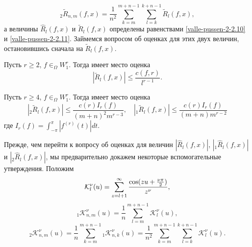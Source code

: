 \begin{equation}\label{valle-pussen-2-2.18}
_2\tilde R_{n,m}(f,x)=\frac1{n^2}\sum_{k=m}^{m+n-1}
\sum_{l=k}^{k+n-1}\tilde R_l(f,x),
\end{equation}
 а величины $\hat R_l(f,x)$  и $\tilde R_l(f,x)$ определены равенствами \eqref{valle-pussen-2-2.10} и \eqref{valle-pussen-2-2.11}. Займемся  вопросом об оценках для этих двух величин, остановившись сначала на  $\tilde R_l(f,x)$.
\begin{lemma}\label{valle-pussen-l2.2}
Пусть $r\ge2$, $f\in _\Omega W^r_1$. Тогда имеет место оценка
\begin{equation}\label{valle-pussen-2-2.19}
|\tilde R_l(f,x)|\le \frac{c(f,r)}{l^{r-1}}.
\end{equation}
\end{lemma}

\begin{lemma}\label{valle-pussen-l2.3}
Пусть $r\ge4$, $f\in _\Omega W^r_1$. Тогда имеет место оценка
\begin{equation*}
|_2\tilde R_l(f,x)|\le \frac{c(r)I_r(f)}{(m+n)^2m^{r-3}}, \quad |_1\tilde R_l(f,x)|\le \frac{c(r)I_r(f)}{(m+n)m^{r-2}}
\end{equation*}
где $I_r(f)=\int_{-\pi}^\pi|f^{(r)}(t)|dt$.
\end{lemma}

Прежде, чем перейти к вопросу об оценках для величин $|\hat R_l(f,x)|$, $|_1\hat R_l(f,x)|$ и $|_2\hat R_l(f,x)|$, мы предварительно докажем некоторые вспомогательные утверждения. Положим
\begin{equation}\label{valle-pussen-2-2.20}
\mathcal{ K}_l^\nu(u)= \sum_{z=l+1}^{\infty}{\cos(zu+\frac{\nu\pi}{2})\over z^\nu},
\end{equation}
\begin{equation}\label{valle-pussen-2-2.21}
_1\mathcal{ K}_{n,m}^\nu(u)=\frac1n \sum_{l=m}^{m+n-1}\mathcal{ K}_l^\nu(u),
\end{equation}
\begin{equation}\label{valle-pussen-2-2.22}
_2\mathcal{ K}_{n,m}^\nu(u)=\frac1n \sum_{k=m}^{m+n-1} {_1}\mathcal{ K}_{n,k}^\nu(u)=
\frac1{n^2} \sum_{k=m}^{m+n-1}\sum_{l=k}^{k+n-1}\mathcal{ K}_l^\nu(u).
\end{equation}


